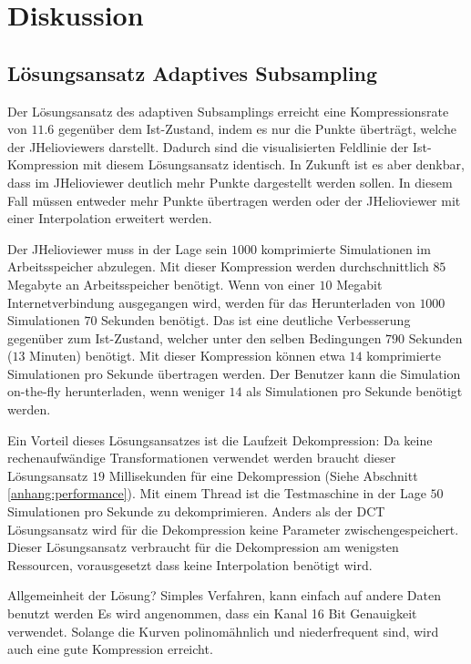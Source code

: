 \section{Diskussion}

\subsection{Lösungsansatz Adaptives Subsampling}
Der Lösungsansatz des adaptiven Subsamplings erreicht eine Kompressionsrate von $11.6$ gegenüber dem Ist-Zustand, indem es nur die Punkte überträgt, welche der JHelioviewers darstellt. Dadurch sind die visualisierten Feldlinie der Ist-Kompression mit diesem Lösungsansatz identisch. In Zukunft ist es aber denkbar, dass im JHelioviewer deutlich mehr Punkte dargestellt werden sollen. In diesem Fall müssen entweder mehr Punkte übertragen werden oder der JHelioviewer mit einer Interpolation erweitert werden.

Der JHelioviewer muss in der Lage sein $1000$ komprimierte Simulationen im Arbeitsspeicher abzulegen. Mit dieser Kompression werden durchschnittlich $85$ Megabyte an Arbeitsspeicher benötigt. Wenn von einer $10$ Megabit Internetverbindung ausgegangen wird, werden für das Herunterladen von $1000$ Simulationen $70$ Sekunden benötigt. Das ist eine deutliche Verbesserung gegenüber zum Ist-Zustand, welcher unter den selben Bedingungen $790$ Sekunden ($13$ Minuten) benötigt. Mit dieser Kompression können etwa $14$ komprimierte Simulationen pro Sekunde übertragen werden. Der Benutzer kann die Simulation on-the-fly herunterladen, wenn weniger $14$ als Simulationen pro Sekunde benötigt werden.

Ein Vorteil dieses Lösungsansatzes ist die Laufzeit Dekompression: Da keine rechenaufwändige Transformationen verwendet werden braucht dieser Lösungsansatz $19$ Millisekunden für eine Dekompression (Siehe Abschnitt \ref{anhang:performance}). Mit einem Thread ist die Testmaschine in der Lage $50$ Simulationen pro Sekunde zu dekomprimieren. Anders als der DCT Lösungsansatz wird für die Dekompression keine Parameter zwischengespeichert. Dieser Lösungsansatz verbraucht für die Dekompression am wenigsten Ressourcen, vorausgesetzt dass keine Interpolation benötigt wird.

Allgemeinheit der Lösung? Simples Verfahren, kann einfach auf andere Daten benutzt werden Es wird angenommen, dass ein Kanal 16 Bit Genauigkeit verwendet. Solange die Kurven polinomähnlich und niederfrequent sind, wird auch eine gute Kompression erreicht.

